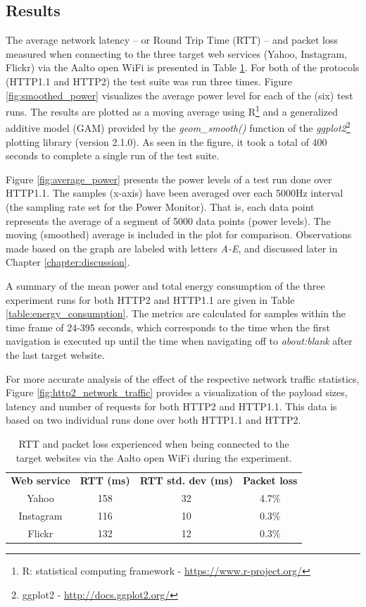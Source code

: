 \documentclass{article}
\begin{document}
\subsection{Results}
\label{chapter:results}

The average network latency -- or Round Trip Time (RTT) -- and packet loss measured when connecting to the three target web services (Yahoo, Instagram, Flickr) via the Aalto open WiFi is presented in Table \ref{table:latency}. For both of the protocols (HTTP1.1 and HTTP2) the test suite was run three times. Figure \ref{fig:smoothed_power} visualizes the average power level for each of the (six) test runs. The results are plotted as a moving average using R\footnote{R: statistical computing framework - \url{https://www.r-project.org/}} and a generalized additive model (GAM) provided by the \emph{geom\_smooth()} function of the \emph{ggplot2}\footnote{ggplot2 - \url{http://docs.ggplot2.org/}} plotting library (version 2.1.0). As seen in the figure, it took a total of 400 seconds to complete a single run of the test suite.

Figure \ref{fig:average_power} presents the power levels of a test run done over HTTP1.1. The samples (x-axis) have been averaged over each 5000Hz interval (the sampling rate set for the Power Monitor). That is, each data point represents the average of a segment of 5000 data points (power levels). The moving (smoothed) average is included in the plot for comparison. Observations made based on the graph are labeled with letters \emph{A-E}, and discussed later in Chapter \ref{chapter:discussion}.

A summary of the mean power and total energy consumption of the three experiment runs for both HTTP2 and HTTP1.1 are given in Table \ref{table:energy_consumption}. The metrics are calculated for samples within the time frame of 24-395 seconds, which corresponds to the time when the first navigation is executed up until the time when navigating off to \emph{about:blank} after the last target website.

For more accurate analysis of the effect of the respective network traffic statistics, Figure \ref{fig:http2_network_traffic} provides a visualization of the payload sizes, latency and number of requests for both HTTP2 and HTTP1.1. This data is based on two individual runs done over both HTTP1.1 and HTTP2.

\begin{table}[h!]
    \centering
    \caption{RTT and packet loss experienced when being connected to the target websites via the Aalto open WiFi during the experiment.}
    \label{table:latency}
    \begin{tabular}{c|c|c|c}
         \textbf{Web service} & \textbf{RTT (ms)} & \textbf{RTT std. dev (ms)} & \textbf{Packet loss} \\
        Yahoo   & 158 & 32 & 4.7\% \\
        Instagram  & 116 & 10 & 0.3\% \\
        Flickr & 132 & 12 & 0.3\% \\
    \end{tabular}
\end{table}
\end{document}
